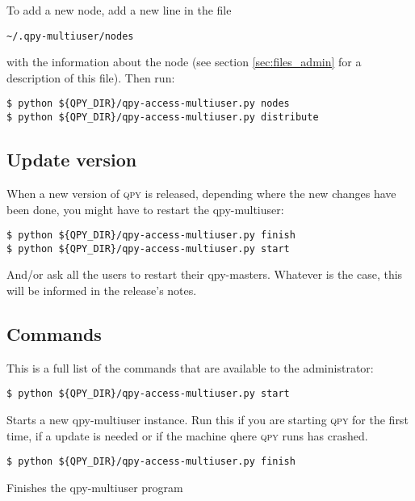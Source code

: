 \documentclass[a4paper,12pt]{article}
\newcommand{\qpy}{\textsc{qpy}}
\begin{document}
To add a new node, add a new line in the file

\begin{verbatim}
~/.qpy-multiuser/nodes
\end{verbatim}

with the information about the node (see section \ref{sec:files_admin} for a description of this file).
Then run:

\begin{verbatim}
$ python ${QPY_DIR}/qpy-access-multiuser.py nodes
$ python ${QPY_DIR}/qpy-access-multiuser.py distribute
\end{verbatim}




\subsection{Update version}

When a new version of \qpy{} is released, depending where the new changes have been done, you might have to restart the qpy-multiuser:

\begin{verbatim}
$ python ${QPY_DIR}/qpy-access-multiuser.py finish
$ python ${QPY_DIR}/qpy-access-multiuser.py start
\end{verbatim}

And/or ask all the users to restart their qpy-masters.
Whatever is the case, this will be informed in the release's notes.



\subsection{Commands}

This is a full list of the commands that are available to the administrator:

\begin{lstlisting}[style=BashStyle]
$ python ${QPY_DIR}/qpy-access-multiuser.py start
\end{lstlisting}

Starts a new qpy-multiuser instance.
Run this if you are starting \qpy{} for the first time, if a update is needed or if the machine qhere \qpy{} runs has crashed.

\begin{lstlisting}[style=BashStyle]
$ python ${QPY_DIR}/qpy-access-multiuser.py finish
\end{lstlisting}

Finishes the qpy-multiuser program
\end{document}
